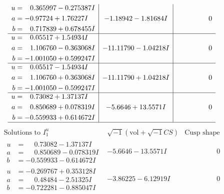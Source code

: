 \documentclass[1p]{elsarticle_modified}
\theoremstyle{definition}
\newcommand{\I}{\sqrt{-1}}
\begin{document}
$$\begin{array}{c|c|c}
\begin{aligned}
u &= \phantom{-}0.365997 - 0.275387 I \\
a &= -0.97724 + 1.76227 I \\
b &= \phantom{-}0.717839 + 0.678455 I\end{aligned}
 & -1.18942 - 1.81684 I & \phantom{-0.000000 } 0 \\ \hline\begin{aligned}
u &= \phantom{-}0.05517 + 1.54934 I \\
a &= \phantom{-}1.106760 - 0.363068 I \\
b &= -1.001050 + 0.599247 I\end{aligned}
 & -11.11790 - 1.04218 I & \phantom{-0.000000 } 0 \\ \hline\begin{aligned}
u &= \phantom{-}0.05517 - 1.54934 I \\
a &= \phantom{-}1.106760 + 0.363068 I \\
b &= -1.001050 - 0.599247 I\end{aligned}
 & -11.11790 + 1.04218 I & \phantom{-0.000000 } 0 \\ \hline\begin{aligned}
u &= \phantom{-}0.73082 + 1.37137 I \\
a &= \phantom{-}0.850689 + 0.078319 I \\
b &= -0.559933 + 0.614672 I\end{aligned}
 & -5.6646 + 13.5571 I & \phantom{-0.000000 } 0\\
 \hline 
 \end{array}$$\newpage$$\begin{array}{c|c|c}  
\text{Solutions to }I^u_{1}& \I (\text{vol} + \sqrt{-1}CS) & \text{Cusp shape}\\
 \hline 
\begin{aligned}
u &= \phantom{-}0.73082 - 1.37137 I \\
a &= \phantom{-}0.850689 - 0.078319 I \\
b &= -0.559933 - 0.614672 I\end{aligned}
 & -5.6646 - 13.5571 I & \phantom{-0.000000 } 0 \\ \hline\begin{aligned}
u &= -0.269767 + 0.353128 I \\
a &= \phantom{-}0.48484 - 2.51325 I \\
b &= -0.722281 - 0.885047 I\end{aligned}
 & -3.86225 - 6.12919 I & \phantom{-0.000000 } 0 \\ \hline\begin{aligned}

\end{aligned}
\end{array}$$
\end{document}
